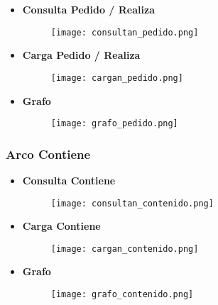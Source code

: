 \documentclass[a4paper]{article}
\begin{document}
\begin{itemize}

    \item \textbf{\large{Consulta Pedido / Realiza}}

    \begin{figure}[H]
        \centering
        \texttt{[image: consultan\_pedido.png]}
        \label{fig:consultan_pedido}
    \end{figure}

    \item \textbf{\large{Carga Pedido / Realiza}}

    \begin{figure}[H]
        \centering
        \texttt{[image: cargan\_pedido.png]}
        \label{fig:cargan_pedido}
    \end{figure}

\newpage

    \item \textbf{\large{Grafo}}

    \begin{figure}[H]
        \centering
        \texttt{[image: grafo\_pedido.png]}
        \label{fig:grafo_pedido}
    \end{figure}

\end{itemize}

\subsubsection{\Large{Arco Contiene}}

\begin{itemize}

    \item \textbf{\large{Consulta Contiene}}

    \begin{figure}[H]
        \centering
        \texttt{[image: consultan\_contenido.png]}
        \label{fig:consultan_contenido}
    \end{figure}

    \item \textbf{\large{Carga Contiene}}

    \begin{figure}[H]
        \centering
        \texttt{[image: cargan\_contenido.png]}
        \label{fig:cargan_contenido}
    \end{figure}

    \item \textbf{\large{Grafo}}

    \begin{figure}[H]
        \centering
        \texttt{[image: grafo\_contenido.png]}
        \label{fig:grafo_contenido}
    \end{figure}

\end{itemize}
\end{document}
